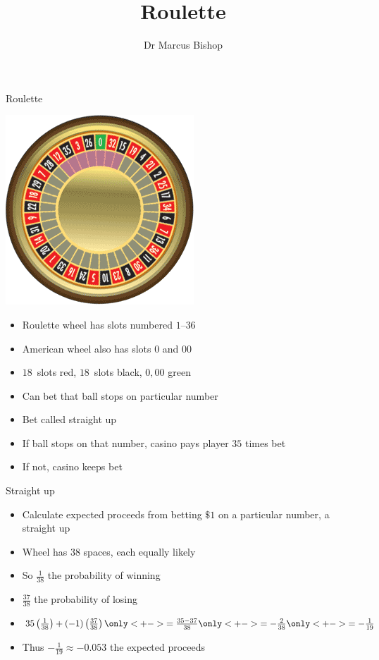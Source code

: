 \documentclass[handout]{beamer}
\title[Roulette]{Roulette}
\author{Dr Marcus Bishop}
\theoremstyle{definition}
\begin{document}
\begin{frame}\titlepage\end{frame}
\LogoOff
\begin{frame}{Roulette}
\begin{multicols}{2}
\includegraphics[scale=.38]{Roulette}
\begin{itemize}
\item Roulette wheel has slots numbered $1$--$36$
\columnbreak
\item American wheel also has slots $0$ and $00$
\item $18$~slots red, $18$~slots black, $0,00$ green
\item Can bet that ball stops on particular number
\item Bet called \alert{straight up}
\item If ball stops on that number, casino pays player
$35$ times bet
\item If not, casino keeps bet
\end{itemize}
\end{multicols}
\end{frame}

\begin{frame}{Straight up}
\begin{itemize}
\item Calculate expected proceeds from betting $\$1$
on a particular number, a \alert{straight up}
\item Wheel has $38$ spaces, each equally likely
\item So $\frac{1}{38}$ the probability of winning
\item $\frac{37}{38}$ the probability of losing
\item $35\left(\frac{1}{38}\right)
+\left(-1\right)\left(\frac{37}{38}\right)
\only<+->{=\frac{35-37}{38}}
\only<+->{=-\frac{2}{38}}
\only<+->{=-\frac{1}{19}}$
\item Thus $-\frac{1}{19}\approx -0.053$ the expected proceeds
\end{itemize}
\end{frame}
\end{document}
